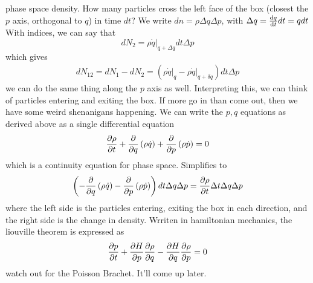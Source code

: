 \documentclass{article} \usepackage{amsmath} \usepackage{amssymb} \usepackage{amsthm} \usepackage[margin=0.2in]{geometry} \usepackage{hyperref} \usepackage{physics} \usepackage{tikz} \usepackage{mathtools} \mathtoolsset{showonlyrefs} \theoremstyle{definition} \newtheorem{theorem}{Theorem}[section] \newtheorem{corollary}{Corollary}[theorem] \newtheorem{lemma}[theorem]{Lemma} \newtheorem{definition}{Definition}[section] \author{Connor Duncan} \date{\today}
\begin{document}
phase space density. How many particles cross the left face of the box (closest the $p$ axis, orthogonal to $q$) in time $dt$? We write $dn=\rho\Delta q\Delta p$, with $\Delta q=\dv{q}{t}dt=qdt$ With indices, we can say that \begin{equation} dN_2=\left.\rho\dot q\right|_{q+\Delta q}dt\Delta p \end{equation} which gives \begin{align} dN_{12}=dN_1-dN_2=\left(\left.\rho\dot q\right|_{q}-\left.\rho\dot q\right|_{q+\delta q}\right)dt\Delta p \end{align} we can do the same thing along the $p$ axis as well. Interpreting this, we can think of particles entering and exiting the box. If more go in than come out, then we have some weird shenanigans happening. We can write the $p,q$ equations as derived above as a single differential equation \begin{equation} \pdv{\rho}{t}+\pdv{}{q}\left(\rho\dot q\right)+\pdv{}{p}\left(\rho \dot p\right)=0 \end{equation} which is a continuity equation for phase space. Simplifies to \begin{equation} \left(-\pdv{}{q}\left(\rho\dot q\right)-\pdv{}{p}\left(\rho\dot p\right)\right)dt\Delta q\Delta p=\pdv{\rho}{t}\Delta t\Delta q\Delta p \end{equation} where the left side is the particles entering, exiting the box in each direction, and the right side is the change in density. Wrriten in hamiltonian mechanics, the liouville theorem is expressed as \begin{equation} \pdv{p}{t}+\pdv{H}{p}\pdv{\rho}{q}-\pdv{H}{q}\pdv{\rho}{p}=0 \end{equation} watch out for the Poisson Brachet. It'll come up later.
\end{document}
